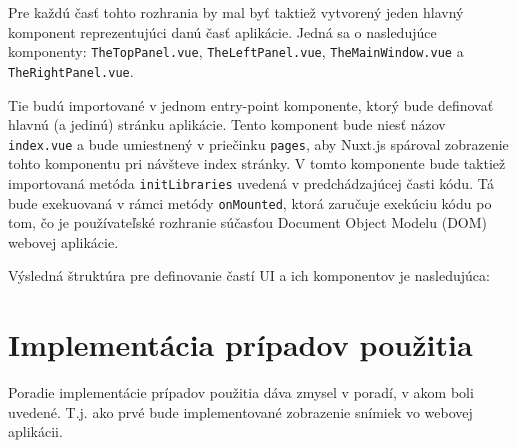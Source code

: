 Pre každú časť tohto rozhrania by mal byť taktiež vytvorený jeden hlavný komponent reprezentujúci danú časť aplikácie. Jedná sa o nasledujúce komponenty: \texttt{TheTopPanel.vue}, \texttt{TheLeftPanel.vue}, \texttt{TheMainWindow.vue} a \texttt{TheRightPanel.vue}.

Tie budú importované v jednom entry-point komponente, ktorý bude definovať hlavnú (a jedinú) stránku aplikácie. Tento komponent bude niesť názov \texttt{index.vue} a bude umiestnený v priečinku \texttt{pages}, aby Nuxt.js spároval zobrazenie tohto komponentu pri návšteve index stránky. V tomto komponente bude taktiež importovaná metóda \texttt{initLibraries} uvedená v predchádzajúcej časti kódu. Tá bude exekuovaná v rámci metódy \texttt{onMounted}, ktorá zaručuje exekúciu kódu po tom, čo je používateľské rozhranie súčasťou Document Object Modelu (DOM) webovej aplikácie.

\clearpage

Výsledná štruktúra pre definovanie častí UI a ich komponentov je nasledujúca:
\begin{figure}[H]
\end{figure}

\section{Implementácia prípadov použitia}
Poradie implementácie prípadov použitia dáva zmysel v poradí, v akom boli uvedené. T.j. ako prvé bude implementované zobrazenie snímiek vo webovej aplikácii. 

